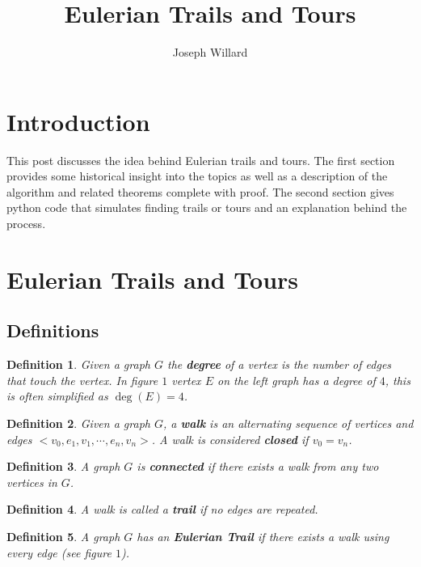 \documentclass{article}
\title{Eulerian Trails and Tours}
\author{Joseph Willard}
\newtheorem{defn}{Definition}[section]
\begin{document}
\maketitle


\section{Introduction}
This post discusses the idea behind Eulerian trails and tours. The first section provides some historical insight into the topics as well as a description of the algorithm and related theorems complete with proof. The second section gives python code that simulates finding trails or tours and an explanation behind the process.


\section{Eulerian Trails and Tours}

\subsection{Definitions}

\begin{defn}
Given a graph $G$ the \textbf{degree} of a vertex is the number of edges that touch the vertex. In figure $1$ vertex $E$ on the left graph has a degree of $4$, this is often simplified as $\deg(E) = 4$.
\end{defn}

\begin{defn}
  Given a graph $G$, a \textbf{\textit{walk}} is an alternating sequence of vertices and edges $<v_{0},e_{1},v_{1},\cdots ,e_{n},v_{n}>$. A walk is considered \textbf{\textit{closed}} if $v_{0} = v_{n}$.
\end{defn}

\begin{defn}
A graph $G$ is \textbf{connected} if there exists a walk from any two vertices in $G$.
\end{defn}


\begin{defn}
  A walk is called a \textbf{\textit{trail}} if no edges are repeated.
\end{defn}

\begin{defn}
A graph $G$ has an \textbf{\textit{Eulerian Trail}} if there exists a walk using every edge (see figure $1$). 
\end{defn}
\end{document}
